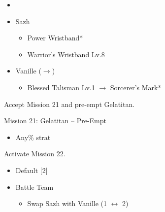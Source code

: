 \begin{menu}
	\begin{itemize}
		\paradigm
		\begin{itemize}
			\item {}%
				  {\paradigmline{(\syn)}{\sab}{(\com)}}%
			      {\paradigmline{\com}{\rav}{\rav}}%
			      {\paradigmline[4]{\syn}{(\sab)}{(\rav)}}%
			      {\paradigmline{\com}{(\rav)}{\com}}%
			      {\paradigmline{\rav}{\sab}{(\rav)}}%
			      {\paradigmline{\com}{\med}{\com}}%
		\end{itemize}
		\equip
		\begin{itemize}
			\item Sazh
				\begin{itemize}
					\item Power Wristband*
					\item Warrior's Wristband Lv.8
				\end{itemize}
			\item Vanille ($\rightarrow$)
				\begin{itemize}
					\item Blessed Talisman Lv.1 $\rightarrow$ Sorcerer's Mark*
				\end{itemize}
		\end{itemize}
	\end{itemize}
\end{menu}

\renewcommand{\first}{[1] Bully (\syn/\sab/\com)}
\renewcommand{\second}{[2] Relentless Assault (\com/\rav/\rav)}
\renewcommand{\third}{[3] Guerilla (\syn/\sab/\rav)}
\renewcommand{\fourth}{[4] Aggression (\com/\rav/\com)}
\renewcommand{\fifth}{[5] Smart Bomb (\rav/\sab/\rav)}
\renewcommand{\sixth}{[6] Tireless Charge (\com/\med/\com)}

Accept Mission 21 and pre-empt Gelatitan.

\begin{battle}{Mission 21: Gelatitan -- Pre-Empt}
	\begin{itemize}
		\item Any\% strat
	\end{itemize}
\end{battle}

Activate Mission 22.

\begin{menu}
	\begin{itemize}
		\paradigm
		\begin{itemize}
			\item Default [2]
			\item Battle Team
				\begin{itemize}
					\item Swap Sazh with Vanille (1 $\leftrightarrow$ 2)
				\end{itemize}						      			      	
		\end{itemize}
	\end{itemize}
\end{menu}

